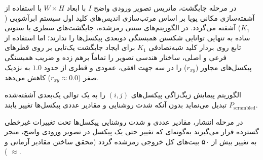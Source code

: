 





در مرحله جایگشت، ماتریس تصویر ورودی واضح $I$ با ابعاد $W \times H$ با استفاده از آشفته‌سازی مکانی پویا بر اساس مرتب‌سازی اندیس‌های کلید اول سیستم ابرآشوبی ($K_1$) آشفته می‌گردد. در الگوریتم‌های سنتی رمزشده، جایگشت‌های سطری یا ستونی ساده به تنهایی توانایی شکستن همبستگی دو‌بعدی پیکسل‌ها را ندارند؛ اما استفاده از تابع  روی بردار کلید شبه‌تصادفی $K_1$ برای ایجاد جایگشت یک‌تایی بر روی قطرهای فرعی و اصلی، ساختار هندسی تصویر را تماماً برهم زده و ضریب همبستگی پیکسل‌های مجاور ($r_{xy}$) را در سه جهت افقی، عمودی و قطری از حدود $1.0$ به نزدیک صفر ($r_{xy} \approx 0.0$) کاهش می‌دهد.\par



الگوریتم پیمایش زیگ‌زاگی پیکسل‌های $(i,\allowbreak{} j)$ را به یک توالی یک‌بعدی آشفته‌شده $P_{\mathrm{scrambled}}$ تبدیل می‌نماید بدون آنکه شدت روشنایی و مقادیر عددی پیکسل‌ها تغییر یابند.\par




در مرحله انتشار، مقادیر عددی و شدت روشنایی پیکسل‌ها تحت تغییرات غیرخطی گسترده قرار می‌گیرند به‌گونه‌ای که تغییر حتی یک پیکسل در تصویر ورودی واضح، منجر به تغییر بیش از ۵۰ بیت‌های کل خروجی رمزشده گردد (محقق ساختن مقادیر آرمانی  و  \ensuremath{\approx} ).\par

